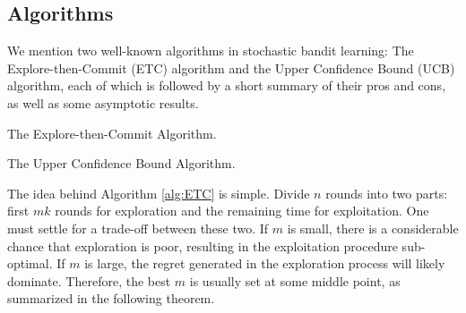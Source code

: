 \documentclass[10pt,a4article]{amsart}
\numberwithin{equation}{section}
\theoremstyle{plain}
\theoremstyle{definition}
\begin{document}
\subsection{Algorithms}

We mention two well-known algorithms in stochastic bandit learning: The Explore-then-Commit (ETC) algorithm and the Upper Confidence Bound (UCB) algorithm, each of which is followed by a short summary of their pros and cons, as well as some asymptotic results.   


\begin{algorithm}
\DontPrintSemicolon
\caption{The Explore-then-Commit Algorithm. } 
\label{alg:ETC}
\end{algorithm}

\begin{algorithm}
\DontPrintSemicolon
\caption{The Upper Confidence Bound Algorithm. } 
\label{alg:UCB}
\end{algorithm}

The idea behind Algorithm \ref{alg:ETC} is simple. Divide $n$ rounds into two parts: first $mk$ rounds for exploration and the remaining time for exploitation. One must settle for a trade-off between these two. If $m$ is small, there is a considerable chance that exploration is poor, resulting in the exploitation procedure sub-optimal.  If $m$ is large, the regret generated in the exploration process will likely dominate. Therefore, the best $m$ is usually set at some middle point, as summarized in the following theorem. 
\end{document}
